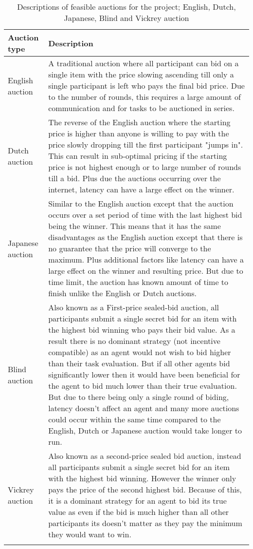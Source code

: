 \begin{longtable}{|p{3cm}|p{12cm}|} \hline
    \textbf{Auction type} & \textbf{Description} \\ \hline
    English auction & A traditional auction where all participant can bid on a single item with the price slowing
        ascending till only a single participant is left who pays the final bid price. Due to the number of rounds,
        this requires a large amount of communication and for tasks to be auctioned in series. \\ \hline

    Dutch auction & The reverse of the English auction where the starting price is higher than anyone is willing to pay
        with the price slowly dropping till the first participant "jumps in". This can result in sub-optimal pricing
        if the starting price is not highest enough or to large number of rounds till a bid. Plus due the auctions
        occurring over the internet, latency can have a large effect on the winner. \\ \hline

    Japanese auction & Similar to the English auction except that the auction occurs over a set period of time with the
        last highest bid being the winner. This means that it has the same disadvantages as the English auction except
        that there is no guarantee that the price will converge to the maximum. Plus additional factors like latency
        can have a large effect on the winner and resulting price. But due to time limit, the auction has known amount
        of time to finish unlike the English or Dutch auctions. \\ \hline

    Blind auction & Also known as a First-price sealed-bid auction, all participants submit a single secret bid for an
        item with the highest bid winning who pays their bid value. As a result there is no dominant strategy (not
        incentive compatible) as an agent would not wish to bid higher than their task evaluation. But if all other
        agents bid significantly lower then it would have been beneficial for the agent to bid much lower than their
        true evaluation. But due to there being only a single round of biding, latency doesn't affect an agent and many
        more auctions could occur within the same time compared to the English, Dutch or Japanese auction would take
        longer to run. \\ \hline

    Vickrey auction~\citep{vickrey} & Also known as a second-price sealed bid auction, instead all participants submit
        a single secret bid for an item with the highest bid winning. However the winner only pays the price of the
        second highest bid. Because of this, it is a dominant strategy for an agent to bid its true value as even if
        the bid is much higher than all other participants its doesn't matter as they pay the minimum they would want
        to win. \\ \hline
    \caption{Descriptions of feasible auctions for the project; English, Dutch, Japanese, Blind and Vickrey auction}
    \label{tab:auctions_descriptions}
\end{longtable}

